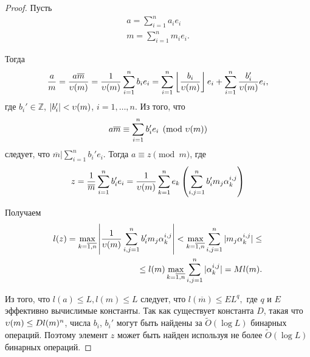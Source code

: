 \documentclass[_00_dissertation.tex]{subfiles}
\begin{document}
\begin{proof}
    Пусть
    \begin{equation*}
        \begin{split}
            a = \sum_{i=1}^n a_i e_i\\
            m = \sum_{i=1}^n m_i e_i.
        \end{split}
    \end{equation*}
    
    Тогда
    \begin{equation*}
        \frac{a}{m} = \frac{a\overline{m}}{\upsilon(m)} =
            \frac{1}{\upsilon(m)}\sum\limits_{i=1}^n b_i e_i =
            \sum\limits_{i=1}^n \left\lfloor
                \frac{b_i}{\upsilon(m)}
            \right\rfloor e_i + \sum\limits_{i=1}^n \frac{b_i'}{\upsilon(m)} e_i,
    \end{equation*}
    где $b_i' \in \mathbb{Z}$, $|b_i'| < \upsilon(m)$, $i = 1, \ldots, n$.
    Из того, что
    \begin{equation*}
        a\overline{m} \equiv \sum_{i=1}^n b_i' e_i \pmod{\upsilon(m)}
    \end{equation*}
    следует, что $\overline{m} \big| \sum_{i=1}^n b_i' e_i$.
    Тогда $a \equiv z \pmod{m}$, где
    \begin{equation*}
        z = \frac{1}{\overline{m}}\sum_{i=1}^n b_i' e_i = \frac{1}{\upsilon(m)}\sum_{k=1}^n e_k\left(
            \sum_{i, j = 1}^n b_i' m_j \alpha_k^{i, j}
        \right)
    \end{equation*}

    Получаем
    \begin{equation*}
        \begin{split}
            l(z) = \max_{k = \overline{1, n}} \left|
                \frac{1}{\upsilon(m)}\sum_{i, j = 1}^n b_i' m_j \alpha_k^{i, j}
            \right| < \max_{k = \overline{1, n}} \sum_{i, j = 1}^n |m_j \alpha_k^{i, j}| \le\\
            \le l(m) \max_{k = \overline{1, n}} \sum_{i, j = 1}^n |\alpha_k^{i, j}| = M l(m).
        \end{split}
    \end{equation*}

    Из того, что $l(a) \leq L, l(m) \leq L$ следует, что $l(\overline{m}) \le E L^q,$ где $q$ и $E$ эффективно вычислимые константы.
    Так как существует константа $D$, такая что $\upsilon(m) \le D l(m)^n$, числа $b_i$, $b_i'$ могут быть найдены за $\tilde{O}(\log L)$ бинарных операций.
    Поэтому элемент $z$ может быть найден используя не более $\tilde{O}(\log L)$ бинарных операций.
\end{proof}
\end{document}
